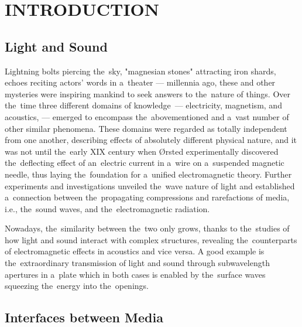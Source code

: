 \chapter{INTRODUCTION}

\section{Light and Sound}

Lightning bolts piercing the~sky, "magnesian stones" attracting iron shards, echoes reciting actors' words in a~theater --- millennia ago, these and other mysteries were inspiring mankind to seek answers to the~nature of things.
Over the~time three different domains of knowledge~--- electricity, magnetism, and acoustics, --- emerged to encompass the~abovementioned and a~vast number of other similar phenomena.
These domains were regarded as totally independent from one another, describing effects of absolutely different physical nature, and it was not until the~early XIX century when {\O}rsted experimentally discovered the~deflecting effect of an~electric current in a~wire on a~suspended magnetic needle, thus laying the~foundation for a~unified electromagnetic theory.
Further experiments and investigations unveiled the~wave nature of light and established a~connection between the~propagating compressions and rarefactions of media, i.e., the~sound waves, and the~electromagnetic radiation.

Nowadays, the~similarity between the~two only grows, thanks to the~studies of how light and sound interact with complex structures, revealing the~counterparts of electromagnetic effects in acoustics and vice versa.
A good example is the~extraordinary transmission of light \cite{ebbesen} and sound \cite{lu,estrada,christensen1} through subwavelength apertures in a~plate which in both cases is enabled by the~surface waves squeezing the~energy into the~openings.

\section{Interfaces between Media}

